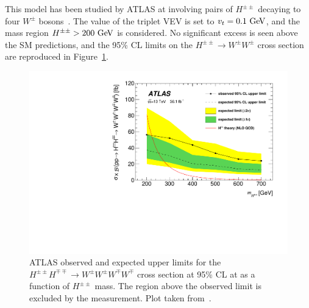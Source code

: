 This model has been studied by ATLAS at  involving pairs of $H^{\pm\pm}$ decaying to four $W^\pm$ bosons~\cite{2019.atlas-double-charged-higgs}.
The value of the triplet VEV is set to $v_t = 0.1\gev$, and the mass region $H^{\pm\pm} > 200\gev$ is considered.
No significant excess is seen above the SM predictions, and the 95\% CL limits on the $H^{\pm\pm}\rightarrow W^{\pm}W^{\pm}$ cross section are reproduced in Figure~\ref{fig:atlas-hpp-limits}.

\begin{figure}[htbp]
  \centering
  \includegraphics[width=.6\textwidth]{figs/ssww_13tev/extensions/atlas-hpp}
  \caption[ATLAS observed and expected upper limits for the $H^{\pm\pm}H^{\mp\mp}\rightarrow W^{\pm}W^{\pm}W^{\mp}W^{\mp}$ cross section at 95\% CL at  as a function of $H^{\pm\pm}$ mass.  The region above the observed limit is excluded by the measurement.]{ATLAS observed and expected upper limits for the $H^{\pm\pm}H^{\mp\mp}\rightarrow W^{\pm}W^{\pm}W^{\mp}W^{\mp}$ cross section at 95\% CL at  as a function of $H^{\pm\pm}$ mass.  The region above the observed limit is excluded by the measurement. Plot taken from~\cite{2019.atlas-double-charged-higgs}.}
  \label{fig:atlas-hpp-limits}
\end{figure}

